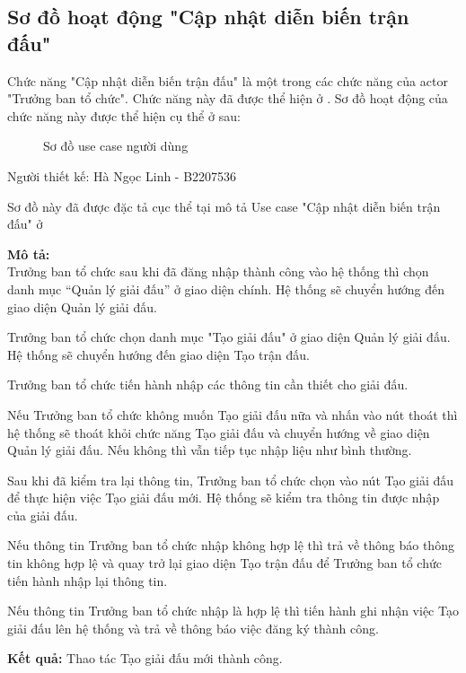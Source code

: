 \subsection{Sơ đồ hoạt động "Cập nhật diễn biến trận đấu"}
\setcounter{figure}{0}

Chức năng "Cập nhật diễn biến trận đấu" là một trong các chức năng của actor "Trưởng ban tổ chức".
Chức năng này đã được thể hiện ở \myref{}.
Sơ đồ hoạt động của chức năng này được thể hiện cụ thể ở  sau:

\begin{figure}[H]
  \centering
  
  \caption{Sơ đồ use case người dùng}
  \label{fig:at-2}
\end{figure}

Người thiết kế: Hà Ngọc Linh - B2207536

Sơ đồ này đã được đặc tả cục thể tại mô tả Use case "Cập nhật diễn biến trận đấu"
ở 

\noindent
\textbf{Mô tả:}\\
Trưởng ban tổ chức sau khi đã đăng nhập thành công vào hệ thống thì chọn danh mục “Quản lý giải đấu” ở giao diện chính. Hệ thống sẽ chuyển hướng đến giao diện Quản lý giải đấu.\par
Trưởng ban tổ chức chọn danh mục "Tạo giải đấu" ở giao diện Quản lý giải đấu. Hệ thống sẽ chuyển hướng đến giao diện Tạo trận đấu.\par
Trưởng ban tổ chức tiến hành nhập các thông tin cần thiết cho giải đấu.\par
Nếu Trưởng ban tổ chức không muốn Tạo giải đấu nữa và nhấn vào nút thoát thì hệ thống sẽ thoát khỏi chức năng Tạo giải đấu và chuyển hướng về giao diện Quản lý giải đấu. Nếu không thì vẫn tiếp tục nhập liệu như bình thường.\par
Sau khi đã kiểm tra lại thông tin, Trưởng ban tổ chức chọn vào nút Tạo giải đấu để thực hiện việc Tạo giải đấu mới. Hệ thống sẽ kiểm tra thông tin được nhập của giải đấu.\par
Nếu thông tin Trưởng ban tổ chức nhập không hợp lệ thì trả về thông báo thông tin không hợp lệ và quay trở lại giao diện Tạo trận đấu để Trưởng ban tổ chức tiến hành nhập lại thông tin.\par
Nếu thông tin Trưởng ban tổ chức nhập là hợp lệ thì tiến hành ghi nhận việc Tạo giải đấu lên hệ thống và trả về thông báo việc đăng ký thành công.

\noindent
\textbf{Kết quả:} Thao tác Tạo giải đấu mới thành công.


